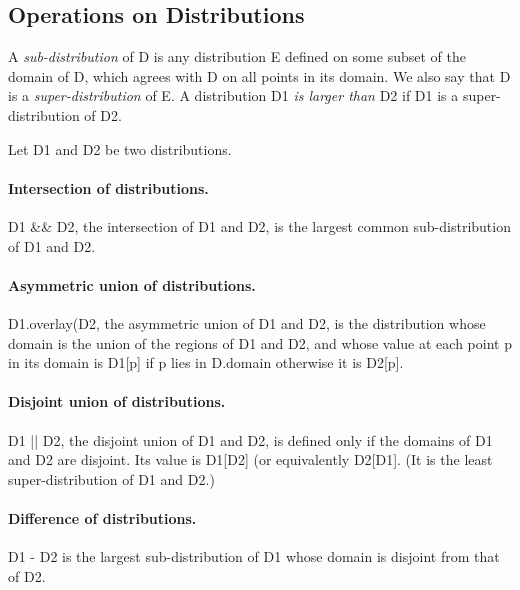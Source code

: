 \subsection{Operations on Distributions}

A {\em sub-distribution} of {\cf D} is any
distribution {\cf E} defined on some subset of the domain of {\cf D},
which agrees with {\cf D} on all points in its domain. We also say
that {\cf D} is a {\em super-distribution} of {\cf E}. A distribution
{\cf D1} {\em is larger than} {\cf D2} if {\cf D1} is a
super-distribution of {\cf D2}.

Let {\cf D1} and {\cf D2} be two distributions.  


\paragraph{Intersection of distributions.}
{\cf D1 \&\& D2}, the intersection of {\cf D1} and {\cf D2}, is the
largest common sub-distribution of {\cf D1} and {\cf D2}.

\paragraph{Asymmetric union of distributions.}
{\cf D1.overlay(D2}, the asymmetric union of {\cf D1} and {\cf D2}, is the
distribution whose domain is the union of the regions of {\cf D1} and
{\cf D2}, and whose value at each point {\cf p} in its domain is {\cf D1[p]}
if {\cf p} lies in {\cf D.domain} otherwise it is {\cf D2[p]}.

\paragraph{Disjoint union of distributions.}
{\cf D1 || D2}, the disjoint union of {\cf D1} and {\cf D2}, is
defined only if the domains of {\cf D1} and {\cf D2} are disjoint. Its
value is {\cf D1[D2]} (or equivalently {\cf D2[D1]}.  (It is the least
super-distribution of {\cf D1} and {\cf D2}.)

\paragraph{Difference of distributions.}
{\cf D1 - D2} is the largest sub-distribution of {\cf D1} whose domain is
disjoint from that of {\cf D2}.



